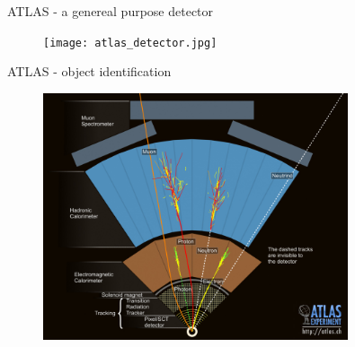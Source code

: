 \begin{frame}{ATLAS - a genereal purpose detector}
    \begin{figure}
        \centering
        \texttt{[image: atlas\_detector.jpg]}
        \caption{\cite{Pequenao:1095924}}
        \label{fig:my_label}
    \end{figure}
\end{frame}


\begin{frame}{ATLAS - object identification}
    \begin{figure}
        \centering
        \includegraphics[width=0.8\textwidth]{figures_theory/atlas_quer.jpg}
        \caption{\cite{Pequenao:1095924}}
        \label{fig:my_label}
    \end{figure}
\end{frame}

